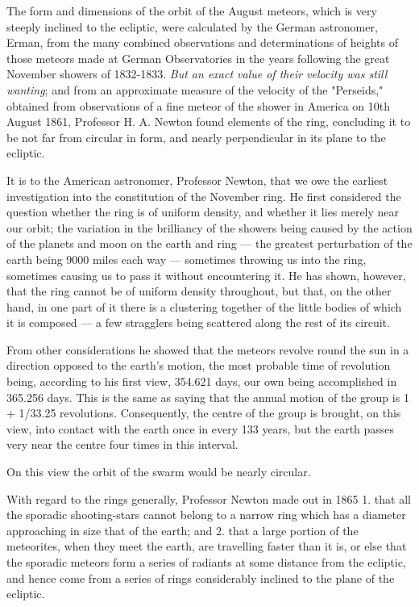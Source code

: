 \documentclass[a4paper, 12pt, oneside, polutonikogreek, english]{article}
\begin{document}
The form and dimensions of the orbit of the August meteors, which is very steeply inclined to the ecliptic, were calculated by the German astronomer, Erman, from the many combined observations and determinations of heights of those meteors made at German Observatories in the years following the great November showers of 1832-1833. \emph{But an exact value of their velocity was still wanting}; and from an approximate measure of the velocity of the "Perseids," obtained from observations of a fine meteor of the shower in America on 10th August 1861, Professor H. A. Newton found elements of the ring, concluding it to be not far from circular in form, and nearly perpendicular in its plane to the ecliptic.

It is to the American astronomer, Professor Newton, that we owe the earliest investigation into the constitution of the November ring. He first considered the question whether the ring is of uniform density, and whether it lies merely near our orbit; the variation in the brilliancy of the showers being caused by the action of the planets and moon on the earth and ring --- the greatest perturbation of the earth being 9000 miles each way --- sometimes throwing us into the ring, sometimes causing us to pass it without encountering it. He has shown, however, that the ring cannot be of uniform density throughout, but that, on the other hand, in one part of it there is a clustering together of the little bodies of which it is composed --- a few stragglers being scattered along the rest of its circuit.

From other considerations he showed that the meteors revolve round the sun in a direction opposed to the earth's motion, the most probable time of revolution being, according to his first view, 354.621 days, our own being accomplished in 365.256 days. This is the same as saying that the annual motion of the group is 1 + 1/33.25 revolutions. Consequently, the centre of the group is brought, on this view, into contact with the earth once in every 133 years, but the earth passes very near the centre four times in this interval.

On this view the orbit of the swarm would be nearly circular.

With regard to the rings generally, Professor Newton made out in 1865 1. that all the sporadic shooting-stars cannot belong to a narrow ring which has a diameter approaching in size that of the earth; and 2. that a large portion of the meteorites, when they meet the earth, are travelling faster than it is, or else that the sporadic meteors form a series of radiants at some distance from the ecliptic, and hence come from a series of rings considerably inclined to the plane of the ecliptic.
\end{document}
